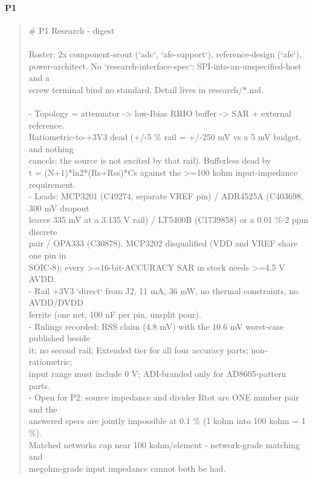 \documentclass[11pt,a4paper]{article}
\begin{document}
\paragraph*{P1}
\begin{quote}\small\ttfamily\raggedright
\# P1 Research - digest\\
~\\
Roster: 2x component-scout (`adc`, `afe-support`), reference-design (`afe`),\\
power-architect. No `research-interface-spec`: SPI-into-an-unspecified-host and a\\
screw terminal bind no standard. Detail lives in research/{*}.md.\\
~\\
- Topology = attenuator -\textgreater{} low-Ibias RRIO buffer -\textgreater{} SAR + external reference.\\
  Ratiometric-to-+3V3 dead (+/-5 \% rail = +/-250 mV vs a 5 mV budget, and nothing\\
  cancels: the source is not excited by that rail). Bufferless dead by\\
  t = (N+1){*}ln2{*}(Rs+Rss){*}Cs against the \textgreater{}=100 kohm input-impedance requirement.\\
- Leads: MCP3201 (C49274, separate VREF pin) / ADR4525A (C403698, 300 mV dropout\\
  leaves 335 mV at a 3.135 V rail) / LT5400B (C1739858) or a 0.01 \%-2 ppm discrete\\
  pair / OPA333 (C30878). MCP3202 disqualified (VDD and VREF share one pin in\\
  SOIC-8); every \textgreater{}=16-bit-ACCURACY SAR in stock needs \textgreater{}=4.5 V AVDD.\\
- Rail +3V3 `direct` from J2, 11 mA, 36 mW, no thermal constraints, no AVDD/DVDD\\
  ferrite (one net, 100 nF per pin, unsplit pour).\\
- Rulings recorded: RSS claim (4.8 mV) with the 10.6 mV worst-case published beside\\
  it; no second rail; Extended tier for all four accuracy parts; non-ratiometric;\\
  input range must include 0 V; ADI-branded only for AD8605-pattern parts.\\
- Open for P2: source impedance and divider Rtot are ONE number pair and the\\
  answered specs are jointly impossible at 0.1 \% (1 kohm into 100 kohm = 1 \%).\\
  Matched networks cap near 100 kohm/element - network-grade matching and\\
  megohm-grade input impedance cannot both be had.
\end{quote}
\end{document}

